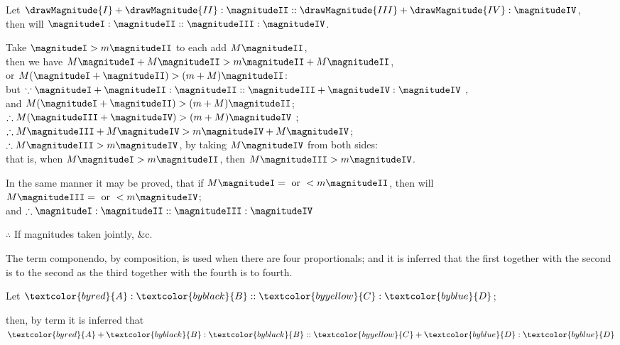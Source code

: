 \documentclass{byrne-book}
\begin{document}
\begin{center}
Let $\drawMagnitude{I} + \drawMagnitude{II} : \magnitudeII :: \drawMagnitude{III} + \drawMagnitude{IV} : \magnitudeIV$,\\
then will $\magnitudeI : \magnitudeII :: \magnitudeIII : \magnitudeIV$.

Take $\magnitudeI > m \magnitudeII$ to each add $M \magnitudeII$,\\
then we have $M \magnitudeI + M \magnitudeII > m \magnitudeII + M \magnitudeII$,\\
or $M (\magnitudeI + \magnitudeII) > (m + M) \magnitudeII$:\\
but $\because \magnitudeI + \magnitudeII: \magnitudeII :: \magnitudeIII + \magnitudeIV: \magnitudeIV$ \bycref{\hypref},\\ %
and $M (\magnitudeI + \magnitudeII) > (m + M) \magnitudeII$;\\
$\therefore M(\magnitudeIII + \magnitudeIV) > (m + M) \magnitudeIV$ ;\\
$\therefore M \magnitudeIII + M \magnitudeIV > m \magnitudeIV + M \magnitudeIV$;\\
$\therefore M \magnitudeIII > m \magnitudeIV$, by taking $M \magnitudeIV$ from both sides:\\
that is, when $M \magnitudeI > m \magnitudeII$, then $M \magnitudeIII > m \magnitudeIV$.

In the same manner it may be proved, that if $M \magnitudeI = \mbox{ or } < m \magnitudeII$, then will $M \magnitudeIII = \mbox{ or } < m \magnitudeIV$;\\
and $\therefore \magnitudeI : \magnitudeII :: \magnitudeIII : \magnitudeIV$ 

$\therefore$ If magnitudes taken jointly, \&c.
\end{center}


\vfill\pagebreak

\label{def:V.XV} 
\def\varA{\textcolor{byred}{A}}
\def\varB{\textcolor{byblack}{B}}
\def\varC{\textcolor{byyellow}{C}}
\def\varD{\textcolor{byblue}{D}}
The term componendo, by composition, is used when there are four proportionals; and it is inferred that the first together with the second is to the second as the third together with the fourth is to fourth.

\begin{center}
Let $\varA : \varB :: \varC : \varD$;

then, by term  it is inferred that\\
$\varA + \varB : \varB :: \varC + \varD: \varD$
\end{center}
\end{document}
